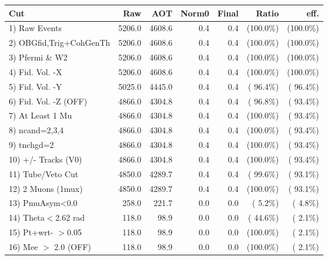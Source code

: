 \begin{table}[h!]\centering
 \begin{tabular}{||l||r|r|r|r|r|r||}
 \hline
 \hline
 Cut & Raw & AOT & Norm0 & Final & Ratio & eff.       \\
 \hline
  1) Raw Events           &       5206.0 &       4608.6 &          0.4 &          0.4 & (100.0\%) & (100.0\%) \\
  2) OBGfid,Trig+CohGenTh &       5206.0 &       4608.6 &          0.4 &          0.4 & (100.0\%) & (100.0\%) \\
  3) Pfermi \& W2         &       5206.0 &       4608.6 &          0.4 &          0.4 & (100.0\%) & (100.0\%) \\
  4) Fid. Vol. -X         &       5206.0 &       4608.6 &          0.4 &          0.4 & (100.0\%) & (100.0\%) \\
  5) Fid. Vol. -Y         &       5025.0 &       4445.0 &          0.4 &          0.4 & ( 96.4\%) & ( 96.4\%) \\
  6) Fid. Vol. -Z (OFF)   &       4866.0 &       4304.8 &          0.4 &          0.4 & ( 96.8\%) & ( 93.4\%) \\
  7) At Least 1 Mu        &       4866.0 &       4304.8 &          0.4 &          0.4 & (100.0\%) & ( 93.4\%) \\
  8) ncand=2,3,4          &       4866.0 &       4304.8 &          0.4 &          0.4 & (100.0\%) & ( 93.4\%) \\
  9) tnchgd=2             &       4866.0 &       4304.8 &          0.4 &          0.4 & (100.0\%) & ( 93.4\%) \\
 10) +/- Tracks (V0)      &       4866.0 &       4304.8 &          0.4 &          0.4 & (100.0\%) & ( 93.4\%) \\
 11) Tube/Veto Cut        &       4850.0 &       4289.7 &          0.4 &          0.4 & ( 99.6\%) & ( 93.1\%) \\
 12) 2 Muons (1mux)       &       4850.0 &       4289.7 &          0.4 &          0.4 & (100.0\%) & ( 93.1\%) \\
 13) PmuAsym<0.0          &        258.0 &        221.7 &          0.0 &          0.0 & (  5.2\%) & (  4.8\%) \\
 14) Theta$<$2.62 rad     &        118.0 &         98.9 &          0.0 &          0.0 & ( 44.6\%) & (  2.1\%) \\
 15) Pt+wrt- $>$0.05      &        118.0 &         98.9 &          0.0 &          0.0 & (100.0\%) & (  2.1\%) \\
 16) Mee $>$ 2.0  (OFF)   &        118.0 &         98.9 &          0.0 &          0.0 & (100.0\%) & (  2.1\%) \\

\end{tabular}
\end{table}
